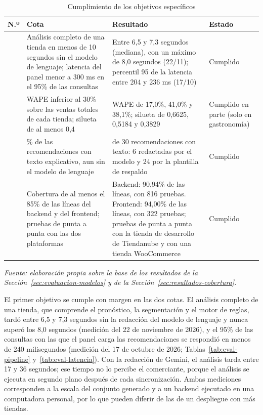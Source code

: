 \begin{table}[!htbp]
\centering
\caption{Cumplimiento de los objetivos específicos}
\label{tab:conclusiones-objetivos}
\renewcommand{\arraystretch}{1.3}
\footnotesize
\setlength{\tabcolsep}{4pt}
\begin{tabular}{|>{\centering\arraybackslash}m{0.6cm}|>{\raggedright\arraybackslash}m{4.4cm}|>{\raggedright\arraybackslash}m{5.4cm}|>{\raggedright\arraybackslash}m{2.6cm}|}
\hline
\textbf{N.º} & \textbf{Cota} & \textbf{Resultado} & \textbf{Estado} \\
\hline
1 & Análisis completo de una tienda en menos de 10 segundos sin el modelo de lenguaje; latencia del panel menor a 300 ms en el 95\% de las consultas & Entre 6,5 y 7,3 segundos (mediana), con un máximo de 8,0 segundos (22/11); percentil 95 de la latencia entre 204 y 236 ms (17/10) & Cumplido \\
\hline
2 & WAPE inferior al 30\% sobre las ventas totales de cada tienda; silueta de al menos 0,4 & WAPE de 17,0\%, 41,0\% y 38,1\%; silueta de 0,6625, 0,5184 y 0,3829 & Cumplido en parte (solo en gastronomía) \\
\hline
3 & 100\% de las recomendaciones con texto explicativo, aun sin el modelo de lenguaje & 30 de 30 recomendaciones con texto: 6 redactadas por el modelo y 24 por la plantilla de respaldo & Cumplido \\
\hline
4 & Cobertura de al menos el 85\% de las líneas del backend y del frontend; pruebas de punta a punta con las dos plataformas & Backend: 90,94\% de las líneas, con 816 pruebas. Frontend: 94,00\% de las líneas, con 322 pruebas; pruebas de punta a punta con la tienda de desarrollo de Tiendanube y con una tienda WooCommerce & Cumplido \\
\hline
\end{tabular}

\smallskip
\noindent\textit{Fuente: elaboración propia sobre la base de los resultados de la Sección~\ref{sec:evaluacion-modelos} y de la Sección~\ref{sec:resultados-cobertura}.}
\end{table}


El primer objetivo se cumple con margen en las dos cotas. El análisis completo de una tienda, que comprende el pronóstico, la segmentación y el motor de reglas, tardó entre 6,5 y 7,3 segundos sin la redacción del modelo de lenguaje y nunca superó los 8,0 segundos (medición del 22 de noviembre de 2026), y el 95\% de las consultas con las que el panel carga las recomendaciones se respondió en menos de 240 milisegundos (medición del 17 de octubre de 2026; Tablas~\ref{tab:eval-pipeline} y~\ref{tab:eval-latencia}). Con la redacción de Gemini, el análisis tarda entre 17 y 36 segundos; ese tiempo no lo percibe el comerciante, porque el análisis se ejecuta en segundo plano después de cada sincronización. Ambas mediciones corresponden a la escala del conjunto generado y a un backend ejecutado en una computadora personal, por lo que pueden diferir de las de un despliegue con más tiendas.

